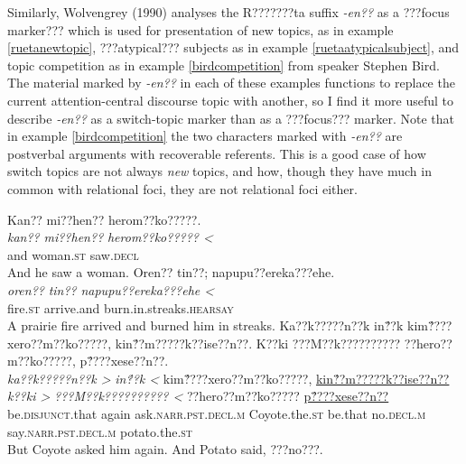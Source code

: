 \documentclass[output=paper]{LSP/langsci}
\begin{document}
	Similarly, Wolvengrey (1990) analyses the R???????ta suffix \emph{-en??} as a ???focus marker??? which is used for presentation of new topics, as in example \ref{ruetanewtopic}, ???atypical??? subjects as in example \ref{ruetaatypicalsubject}, and topic competition as in example \ref{birdcompetition} from speaker Stephen Bird. The material marked by \emph{-en??} in each of these examples functions to replace the current attention-central discourse topic with another, so I find it more useful to describe \emph{-en??} as a switch-topic marker than as a ???focus??? marker. Note that in example \ref{birdcompetition} the two characters marked with \emph{-en??} are postverbal arguments with recoverable referents. This is a good case of how switch topics are not always \emph{new} topics, and how, though they have much in common with relational foci, they are not relational foci either.

\ea\label{ruetaswitchtopic}
\ea\label{ruetanewtopic}
Kan?? mi??hen?? herom??ko?????.\footnotemark\\
\gll 	\emph{kan??}	 	\emph{mi??hen??} 	\emph{herom??ko????? <}\\
	and 			woman.\textsc{st} 	saw.\textsc{decl}\\
\glt	And he saw a woman.
\ex\label{ruetaatypicalsubject}
Oren?? tin??; napupu??ereka???ehe.\footnotemark\\
\gll 	\emph{oren??}	\emph{tin??}	\emph{napupu??ereka???ehe <}\\
	fire.\textsc{st} 	arrive.and 	burn.in.streaks.\textsc{hearsay}\\
\glt	A prairie fire arrived and burned him in streaks.
\ex\label{birdcompetition}
Ka??k?????n??k in\'{??}k kim\'{??}??xero??m??ko?????, kin\'{??}m?????k??ise??n??. K??ki ???M??k?????????? ??hero??m??ko?????, p\'{??}??xese??n??.\footnotemark\\
\gll 	\emph{ka??k?????n??k >}		\emph{in\'{??}k <} 	kim\'{??}??xero??m??ko?????, 		\underline{kin\'{??}m?????k??ise??n??}	\emph{k??ki >}	\emph{???M??k?????????? <}			??hero??m??ko????? 			\underline{p\'{??}??xese??n??}\\
	be.\textsc{disjunct}.that 	again 			ask.\textsc{narr.pst.decl.m} 	Coyote.the.\textsc{st}		be.that 		no.\textsc{decl.m} 					say.\textsc{narr.pst.decl.m} 	potato.the.\textsc{st}\\
\glt	But Coyote asked him again. And Potato said, ???no???.
\z\z
\end{document}
